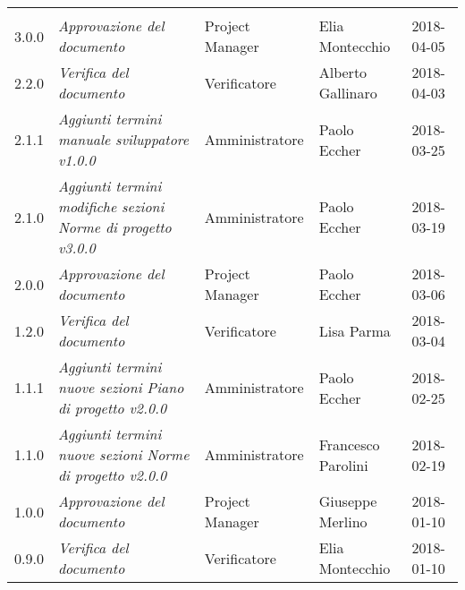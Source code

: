\newpage 
\section*{}
\begin{table}[H]
	\centering
	\begin{tabular}{C{2cm}|C{4cm}|C{3cm}|C{3cm}|R{2cm}}
		
		  &  & &  & \\
		
		
		3.0.0 & \emph{Approvazione del documento} & Project Manager & Elia Montecchio & 2018-04-05  \\
		\hline
		
		2.2.0 & \emph{Verifica del documento} & Verificatore & Alberto Gallinaro & 2018-04-03  \\
		\hline
		
		2.1.1 & \emph{Aggiunti termini manuale sviluppatore v1.0.0} & Amministratore & Paolo Eccher & 2018-03-25  \\
		\hline
		
		2.1.0 & \emph{Aggiunti termini modifiche sezioni Norme di progetto v3.0.0} & Amministratore &  Paolo Eccher & 2018-03-19  \\
		\hline
		
		2.0.0 & \emph{Approvazione del documento} & Project Manager & Paolo Eccher & 2018-03-06  \\
		\hline
		
		1.2.0 & \emph{Verifica del documento} & Verificatore & Lisa Parma & 2018-03-04  \\
		\hline
		
		1.1.1 & \emph{Aggiunti termini nuove sezioni Piano di progetto v2.0.0} & Amministratore & Paolo Eccher & 2018-02-25  \\
		\hline
		
		1.1.0 & \emph{Aggiunti termini nuove sezioni Norme di progetto v2.0.0} & Amministratore & Francesco Parolini & 2018-02-19  \\
		\hline
		
		1.0.0 & \emph{Approvazione del documento} & Project Manager & Giuseppe Merlino & 2018-01-10  \\
		\hline
		
		0.9.0 & \emph{Verifica del documento} & Verificatore & Elia Montecchio  & 2018-01-10 \\
		\hline
		

\end{tabular}
\end{table}
